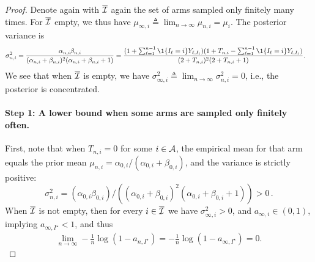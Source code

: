 \begin{proof}
	Denote again with $\overline{\mathcal{I}}$ again the set of arms sampled only finitely many times. For $\overline{\mathcal{I}}$ empty, we thus have $\mu_{\infty, i} \triangleq \lim_{n \rightarrow \infty} \mu_{n,i} = \mu_i$. The posterior variance is
	\begin{align*}
	\sigma_{n,i}^2 &= \frac{\alpha_{n,i}\beta_{n,i}}{(\alpha_{n,i}+ \beta_{n,i})^2 (\alpha_{n,i} + \beta_{n,i} + 1)}
	= \frac{(1 + \sum_{\ell=1}^{n-1} \1{\{ I_{\ell} = i \}} Y_{\ell,I_{\ell}}) (1 + T_{n,i} - \sum_{\ell=1}^{n-1} \1{\{ I_{\ell} = i \}} Y_{\ell,I_{\ell}})  }{ (2 + T_{n,i})^2 (2 + T_{n,i} +1)}.
	\end{align*}
	We see that when $\overline{\mathcal{I}}$ is empty, we have $\sigma_{\infty, i}^2 \triangleq \lim_{n \rightarrow \infty} \sigma_{n,i}^2 = 0$, i.e., the posterior is concentrated. 
	
\paragraph*{Step 1: A lower bound when some arms are sampled only finitely often.}
First, note that when $T_{n,i} = 0$ for some $i \in \mathcal{A}$, the empirical mean for that arm equals the prior mean $\mu_{n,i} = \alpha_{0,i} / (\alpha_{0,i} + \beta_{0,i})$, and the variance is strictly positive:
\[
    \sigma^2_{n,i} = (\alpha_{0,i}\beta_{0,i}) / \left( (\alpha_{0,i}+ \beta_{0,i})^2 (\alpha_{0,i} + \beta_{0,i} + 1)\right) > 0\,.
\] 
When $\overline{\mathcal{I}}$ is not empty, then for every $i \in \overline{\mathcal{I}}$ we have $\sigma_{\infty, i}^2 > 0$, and $a_{\infty, i} \in (0,1)$, implying $a_{\infty, I^\star} < 1$, and thus
\begin{align*}
\lim_{n \rightarrow \infty} - \frac{1}{n} \log \left( 1- a_{n,I^\star} \right) = - \frac{1}{n} \log \left( 1- a_{\infty,I^\star} \right) = 0.
\end{align*}


\end{proof}
